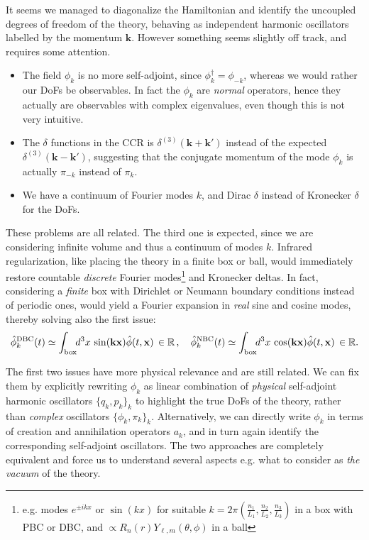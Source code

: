 \documentclass[../QFT_main.tex]{subfiles}
\begin{document}
\begin{mytheorem}
It seems we managed to diagonalize the Hamiltonian and identify the uncoupled degrees of freedom of the theory, behaving as independent harmonic oscillators labelled by the momentum $\mathbf{k}$.
However something seems slightly off track, and requires some attention.
\begin{itemize}
    \item The field $\phi_k$ is no more self-adjoint, since $\phi_k^{\dagger} = \phi_{-k}$, whereas we would rather our DoFs be observables.
    In fact the $\phi_k$ are \emph{normal} operators, hence they actually are observables with complex eigenvalues, even though this is not very intuitive. 
    \item The $\delta$ functions in the CCR is $\delta^{(3)}(\mathbf{k} + \mathbf{k}')$ instead of the expected $\delta^{(3)}(\mathbf{k} - \mathbf{k}')$, suggesting that the conjugate momentum of the mode $\phi_k$ is actually $\pi_{-k}$ instead of $\pi_k$.
    \item We have a continuum of Fourier modes $k$, and Dirac $\delta$ instead of Kronecker $\delta$ for the DoFs.
\end{itemize}

These problems are all related.
The third one is expected, since we are considering infinite volume and thus a continuum of modes $k$.
Infrared regularization, like placing the theory in a finite box or ball, would immediately restore countable \emph{discrete} Fourier modes\footnote{e.g. modes $e^{\pm ikx}$ or $\sin(kx)$ for suitable $k=2\pi(\tfrac{n_1}{L_1},\tfrac{n_2}{L_2},\tfrac{n_3}{L_3})$ in a box with PBC or DBC, and $\propto R_n(r) Y_{\ell,m}(\theta,\phi)$ in a ball} and Kronecker deltas.
In fact, considering a \emph{finite} box with Dirichlet or Neumann boundary conditions instead of periodic ones, would yield a Fourier expansion in \emph{real} sine and cosine modes, thereby solving also the first issue:
\begin{align}\label{eq:other_BCs_IR_regulated_field}
    \hat{\phi}^{\mathrm{DBC}}_k(t) \simeq  \int_{\text{box}} \!\!d^3 x\, \sin(\mathbf{k} \mathbf{x}) \hat{\phi}(t, \mathbf{x})\,\in\mathbb{R}\,, \quad
    \hat{\phi}^{\mathrm{NBC}}_k(t) \simeq \int_{\text{box}} \!\!d^3 x\, \cos(\mathbf{k} \mathbf{x}) \hat{\phi}(t, \mathbf{x})\,\in\mathbb{R}.
\end{align}

The first two issues have more physical relevance and are still related.
We can fix them by explicitly rewriting $\phi_k$ as linear combination of \emph{physical} self-adjoint harmonic oscillators $\{q_k,p_k\}_k$ to highlight the true DoFs of the theory, rather than \emph{complex} oscillators $\{\phi_k,\pi_k\}_k$.
Alternatively, we can directly write $\phi_k$ in terms of creation and annihilation operators $a_k$, and in turn again identify the corresponding self-adjoint oscillators.
The two approaches are completely equivalent and force us to understand several aspects e.g. what to consider as \emph{the vacuum} of the theory.
%
\end{mytheorem}
\end{document}
